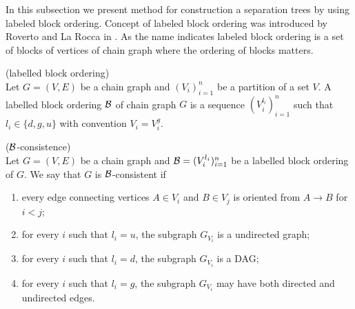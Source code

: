 %
%


In this subsection we present method for construction a separation trees by using labeled block ordering.
Concept of labeled block ordering was introduced by Roverto and La Rocca in \cite{LBO}.  
As the name indicates labeled block ordering is a set of blocks of vertices of chain graph 
where the ordering of blocks matters. 


\begin{defi} (labelled block ordering) \\ 
	Let $G = (V, E)$ be a chain graph and $(V_i)_{i = 1}^{n}$ be a partition of a set $V$. A labelled block ordering 
	$\mathcal{B}$ of chain graph $G$ is a sequence $(V_i^{l_i})_{i = 1}^{n}$ such that $l_i \in \{d, g, u\}$ with convention $V_i = V_i^{g}$.
\end{defi}


\begin{defi} ($\mathcal{B}$-consistence) \\ 
	Let $G = (V, E)$ be a chain graph and $\mathcal{B} = (V_i^{l_i})_{i = 1}^{n}$ be a labelled block ordering of $G$. We say that
	$G$ is $\mathcal{B}$-consistent if 
	
	\begin{enumerate}
		\item every edge connecting vertices $A \in V_i$ and $B \in V_j$ is oriented from $A \rightarrow B$ for $i < j$; 
		\item for every $i$ such that $l_i = u$, the subgraph $G_{V_i}$ is a undirected graph;
		\item for every $i$ such that $l_i = d$, the subgraph $G_{V_i}$ is a DAG;
		\item for every $i$ such that $l_i = g$, the subgraph $G_{V_i}$ may have both directed and undirected edges. 
	\end{enumerate}
\end{defi}

